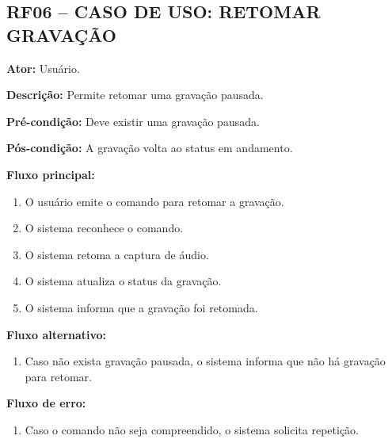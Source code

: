 \documentclass[12pt,oneside,a4paper,brazil,final]{abntex2}
\begin{document}
\clearpage
\subsection*{RF06 -- CASO DE USO: RETOMAR GRAVAÇÃO}



\textbf{Ator:} Usuário.



\textbf{Descrição:} Permite retomar uma gravação pausada.



\textbf{Pré-condição:} Deve existir uma gravação pausada.



\textbf{Pós-condição:} A gravação volta ao status em andamento.



\textbf{Fluxo principal:}

\begin{enumerate}

    \item O usuário emite o comando para retomar a gravação.

    \item O sistema reconhece o comando.

    \item O sistema retoma a captura de áudio.

    \item O sistema atualiza o status da gravação.

    \item O sistema informa que a gravação foi retomada.

\end{enumerate}



\textbf{Fluxo alternativo:}

\begin{enumerate}

    \item Caso não exista gravação pausada, o sistema informa que não há gravação para retomar.

\end{enumerate}



\textbf{Fluxo de erro:}

\begin{enumerate}

    \item Caso o comando não seja compreendido, o sistema solicita repetição.

\end{enumerate}
\end{document}
